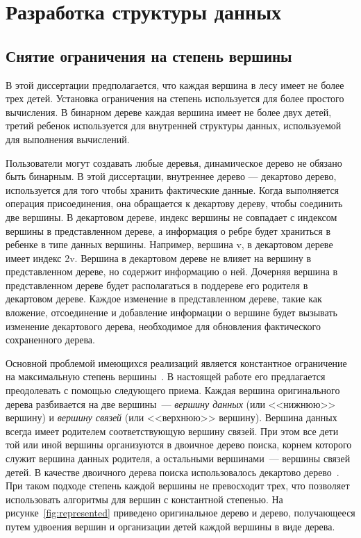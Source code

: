 \documentclass[specification,annotation]{itmo-student-thesis}
\begin{document}
\chapter{Разработка структуры данных}

\section{Снятие ограничения на степень вершины}

В этой диссертации предполагается, что каждая вершина в лесу имеет не более трех детей. Установка ограничения на степень используется для более простого 
вычисления. В бинарном дереве каждая вершина имеет не более двух детей, третий ребенок используется для внутренней структуры данных, используемой для 
выполнения вычислений.

Пользователи могут создавать любые деревья, динамическое дерево не обязано быть бинарным. В этой диссертации, внутреннее дерево --- декартово дерево, 
используется для того чтобы хранить фактические данные. Когда выполняется операция присоединения, она обращается к декартову дереву, чтобы соединить две 
вершины. В декартовом дереве, индекс вершины не совпадает с индексом вершины в представленном дереве, а информация о ребре будет храниться в ребенке в типе 
данных вершины. Например, вершина v, в декартовом дереве имеет индекс 2v. Вершина в декартовом дереве не влияет на вершину в представленном дереве, но 
содержит информацию о ней. Дочерняя вершина в представленном дереве будет располагаться в поддереве его родителя в декартовом дереве. Каждое изменение в 
представленном дереве, такие как вложение, отсоединение и добавление информации о вершине будет вызывать изменение декартового дерева, необходимое для 
обновления фактического сохраненного дерева.

Основной проблемой имеющихся реализаций является константное ограничение на максимальную степень вершины~\cite{acar04}. В настоящей работе его предлагается преодолевать
с помощью следующего приема. Каждая вершина оригинального дерева разбивается на две вершины~--- \emph{вершину данных} (или <<нижнюю>> вершину) и \emph{вершину связей} (или <<верхнюю>> вершину).
Вершина данных всегда имеет родителем соответствующую вершину связей. При этом все дети той или иной вершины организуются в двоичное дерево поиска, корнем которого служит вершина данных родителя, а
остальными вершинами~--- вершины связей детей. В качестве двоичного дерева поиска использовалось декартово дерево~\cite{cartesian-tree}. При таком подходе степень каждой вершины не превосходит трех, что
позволяет использовать алгоритмы для вершин с константной степенью. На рисунке~\ref{fig:represented} приведено оригинальное дерево и дерево, получающееся путем удвоения вершин и организации детей каждой
вершины в виде дерева.
\end{document}
